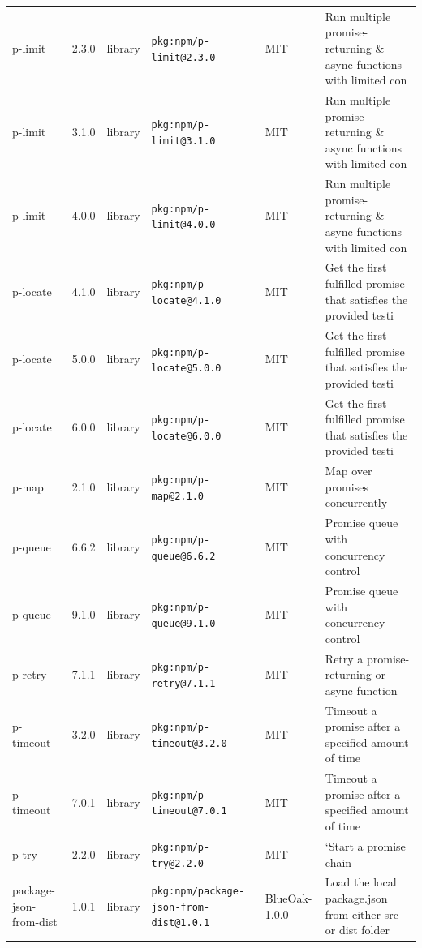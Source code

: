 \documentclass[11pt,a4paper]{article}
\begin{document}
\begin{longtable}{|p{4cm}|p{2cm}|p{1.6cm}|p{5cm}|p{1.5cm}|p{3.5cm}|}
\raggedright p-limit & 2.3.0 & library & \small\texttt{pkg:npm/p-limit@2.3.0} & MIT & \small Run multiple promise-returning \& async functions with limited con \\
\raggedright p-limit & 3.1.0 & library & \small\texttt{pkg:npm/p-limit@3.1.0} & MIT & \small Run multiple promise-returning \& async functions with limited con \\
\raggedright p-limit & 4.0.0 & library & \small\texttt{pkg:npm/p-limit@4.0.0} & MIT & \small Run multiple promise-returning \& async functions with limited con \\
\raggedright p-locate & 4.1.0 & library & \small\texttt{pkg:npm/p-locate@4.1.0} & MIT & \small Get the first fulfilled promise that satisfies the provided testi \\
\raggedright p-locate & 5.0.0 & library & \small\texttt{pkg:npm/p-locate@5.0.0} & MIT & \small Get the first fulfilled promise that satisfies the provided testi \\
\raggedright p-locate & 6.0.0 & library & \small\texttt{pkg:npm/p-locate@6.0.0} & MIT & \small Get the first fulfilled promise that satisfies the provided testi \\
\raggedright p-map & 2.1.0 & library & \small\texttt{pkg:npm/p-map@2.1.0} & MIT & \small Map over promises concurrently \\
\raggedright p-queue & 6.6.2 & library & \small\texttt{pkg:npm/p-queue@6.6.2} & MIT & \small Promise queue with concurrency control \\
\raggedright p-queue & 9.1.0 & library & \small\texttt{pkg:npm/p-queue@9.1.0} & MIT & \small Promise queue with concurrency control \\
\raggedright p-retry & 7.1.1 & library & \small\texttt{pkg:npm/p-retry@7.1.1} & MIT & \small Retry a promise-returning or async function \\
\raggedright p-timeout & 3.2.0 & library & \small\texttt{pkg:npm/p-timeout@3.2.0} & MIT & \small Timeout a promise after a specified amount of time \\
\raggedright p-timeout & 7.0.1 & library & \small\texttt{pkg:npm/p-timeout@7.0.1} & MIT & \small Timeout a promise after a specified amount of time \\
\raggedright p-try & 2.2.0 & library & \small\texttt{pkg:npm/p-try@2.2.0} & MIT & \small `Start a promise chain \\
\raggedright package-json-from-dist & 1.0.1 & library & \small\texttt{pkg:npm/package-json-from-dist@1.0.1} & BlueOak-1.0.0 & \small Load the local package.json from either src or dist folder \\

\end{longtable}
\end{document}
